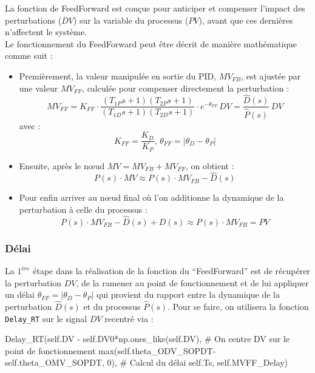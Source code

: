 La fonction de FeedForward est conçue pour anticiper et compenser l'impact des perturbations ($DV$) sur la variable du processus ($PV$), 
avant que ces dernières n'affectent le système.
\\Le fonctionnement du FeedForward peut être décrit de manière mathématique comme suit : 
\begin{itemize}
	\item 
	 Premièrement, la valeur manipulée en sortie du PID, $MV_{FB}$, est ajustée par une valeur $MV_{FF}$, calculée pour compenser directement la perturbation :
	\[MV_{FF} = K_{FF}\cdot\frac{(T_{1P}s + 1)(T_{2P}s + 1)}{(T_{1D}s + 1)(T_{2D}s + 1)}\cdot e^{-\theta_{FF}}\,DV = \frac{\hat{D}(s)}{\hat{P}(s)}\,DV\]
	avec : 
	\[K_{FF} = \frac{K_D}{K_P},\,\theta_{FF} = |\theta_D - \theta_P|\]
	\item 
	Ensuite, après le n\oe{}ud $MV = MV_{FB} + MV_{FF}$, on obtient : 
	\[P(s)\cdot MV \approx P(s)\cdot MV_{FB} - \hat{D}(s)\]
	\item
	 Pour enfin arriver au n\oe{}ud final où l'on additionne la dynamique de la perturbation à celle du processus : 
	\[P(s)\cdot MV_{FB} - \hat{D}(s) + D(s) \approx P(s)\cdot MV_{FB} = PV\]
\end{itemize}
\subsubsection{Délai}

La $1^{ère}$ étape dans la réalisation de la fonction du ``FeedForward'' est de récupérer la perturbation $DV$, de la ramener au point de fonctionnement et de lui appliquer un délai $\theta_{FF} = |\theta_D-\theta_P|$ qui provient du rapport entre la dynamique de la perturbation
$\hat{D}(s)$ et du processus $\hat{P}(s)$.
Pour se faire, on utilisera la fonction \texttt{Delay\_RT} sur le signal $DV$ recentré via : 
\begin{python*}
	Delay_RT(self.DV - self.DV0*np.ones_like(self.DV), # On centre DV sur le point de fonctionnement
		max(self.theta_ODV_SOPDT-self.theta_OMV_SOPDT, 0), # Calcul du délai 
		self.Ts, 
		self.MVFF_Delay)
\end{python*}

